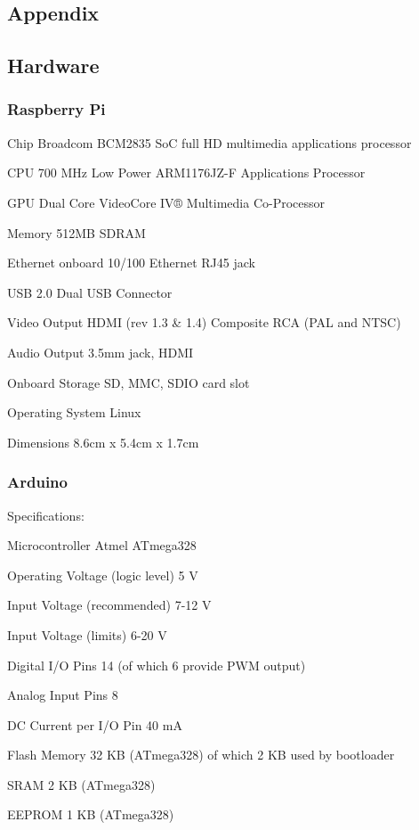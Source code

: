 \documentclass[12pt]{report}
\begin{document}
\newpage

\begin{appendices}
\chapter{Appendix}
\section{Hardware}
\subsection*{Raspberry Pi}

Chip Broadcom BCM2835 SoC full HD multimedia applications processor

CPU 700 MHz Low Power ARM1176JZ-F Applications Processor

GPU	Dual Core VideoCore IV® Multimedia Co-Processor
	  	
Memory 512MB SDRAM

Ethernet onboard 10/100 Ethernet RJ45 jack

USB 2.0 Dual USB Connector

Video Output HDMI (rev 1.3 \& 1.4) Composite RCA (PAL and NTSC)

Audio Output 3.5mm jack, HDMI

Onboard Storage SD, MMC, SDIO card slot

Operating System Linux

Dimensions 8.6cm x 5.4cm x 1.7cm
\subsection*{Arduino}

Specifications:

Microcontroller	Atmel ATmega328

Operating Voltage (logic level)	5 V

Input Voltage (recommended)	7-12 V

Input Voltage (limits)	6-20 V

Digital I/O Pins	14 (of which 6 provide PWM output)

Analog Input Pins	8

DC Current per I/O Pin	40 mA

Flash Memory	32 KB (ATmega328) of which 2 KB used by bootloader

SRAM  2 KB (ATmega328)

EEPROM	1 KB (ATmega328)


\end{appendices}
\end{document}
